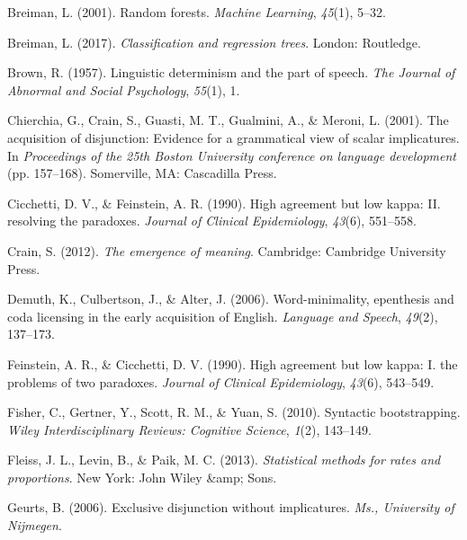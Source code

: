 \documentclass[floatsintext,man]{apa6}
\theoremstyle{definition}
\theoremstyle{definition}
\theoremstyle{definition}
\theoremstyle{remark}
\begin{document}
\setlength{\parindent}{-0.5in} \setlength{\leftskip}{0.5in}

\hypertarget{refs}{}
\hypertarget{ref-breiman2001random}{}
Breiman, L. (2001). Random forests. \emph{Machine Learning},
\emph{45}(1), 5--32.

\hypertarget{ref-breiman2017classification}{}
Breiman, L. (2017). \emph{Classification and regression trees}. London:
Routledge.

\hypertarget{ref-brown1957linguistic}{}
Brown, R. (1957). Linguistic determinism and the part of speech.
\emph{The Journal of Abnormal and Social Psychology}, \emph{55}(1), 1.

\hypertarget{ref-chierchia2001acquisition}{}
Chierchia, G., Crain, S., Guasti, M. T., Gualmini, A., \& Meroni, L.
(2001). The acquisition of disjunction: Evidence for a grammatical view
of scalar implicatures. In \emph{Proceedings of the 25th Boston
University conference on language development} (pp. 157--168).
Somerville, MA: Cascadilla Press.

\hypertarget{ref-cicchetti1990high}{}
Cicchetti, D. V., \& Feinstein, A. R. (1990). High agreement but low
kappa: II. resolving the paradoxes. \emph{Journal of Clinical
Epidemiology}, \emph{43}(6), 551--558.

\hypertarget{ref-crain2012emergence}{}
Crain, S. (2012). \emph{The emergence of meaning}. Cambridge: Cambridge
University Press.

\hypertarget{ref-demuth2006word}{}
Demuth, K., Culbertson, J., \& Alter, J. (2006). Word-minimality,
epenthesis and coda licensing in the early acquisition of English.
\emph{Language and Speech}, \emph{49}(2), 137--173.

\hypertarget{ref-feinstein1990high}{}
Feinstein, A. R., \& Cicchetti, D. V. (1990). High agreement but low
kappa: I. the problems of two paradoxes. \emph{Journal of Clinical
Epidemiology}, \emph{43}(6), 543--549.

\hypertarget{ref-fisher2010syntactic}{}
Fisher, C., Gertner, Y., Scott, R. M., \& Yuan, S. (2010). Syntactic
bootstrapping. \emph{Wiley Interdisciplinary Reviews: Cognitive
Science}, \emph{1}(2), 143--149.

\hypertarget{ref-fleiss2013statistical}{}
Fleiss, J. L., Levin, B., \& Paik, M. C. (2013). \emph{Statistical
methods for rates and proportions}. New York: John Wiley \&amp; Sons.

\hypertarget{ref-geurts2006exclusive}{}
Geurts, B. (2006). Exclusive disjunction without implicatures.
\emph{Ms., University of Nijmegen}.
\end{document}
